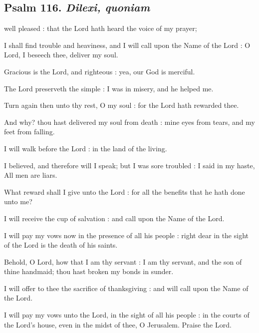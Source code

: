 \subsection{Psalm 116. \textit{Dilexi, quoniam}}

 well pleased : that the Lord hath heard the voice of my prayer;\par
{}
I shall find trouble and heaviness, and I will call upon the Name of the Lord : O Lord, I beseech thee, deliver my soul.\par
{}Gracious is the Lord, and righteous : yea, our God is merciful.\par
{}The Lord preserveth the simple : I was in misery, and he helped me.\par
{}Turn again then unto thy rest, O my soul : for the Lord hath rewarded thee.\par
{}And why? thou hast delivered my soul from death : mine eyes from tears, and my feet from falling.\par
{}I will walk before the Lord : in the land of the living.\par
{}I believed, and therefore will I speak; but I was sore troubled : I said in my haste, All men are liars.\par
{}What reward shall I give unto the Lord : for all the benefits that he hath done unto me?\par
{}I will receive the cup of salvation : and call upon the Name of the Lord.\par
{}I will pay my vows now in the presence of all his people : right dear in the sight of the Lord is the death of his saints.\par
{}Behold, O Lord, how that I am thy servant : I am thy servant, and the son of thine handmaid; thou hast broken my bonds in sunder.\par
{}I will offer to thee the sacrifice of thanksgiving : and will call upon the Name of the Lord.\par
{}I will pay my vows unto the Lord, in the sight of all his people : in the courts of the Lord's house, even in the midst of thee, O Jerusalem. Praise the Lord.\par

